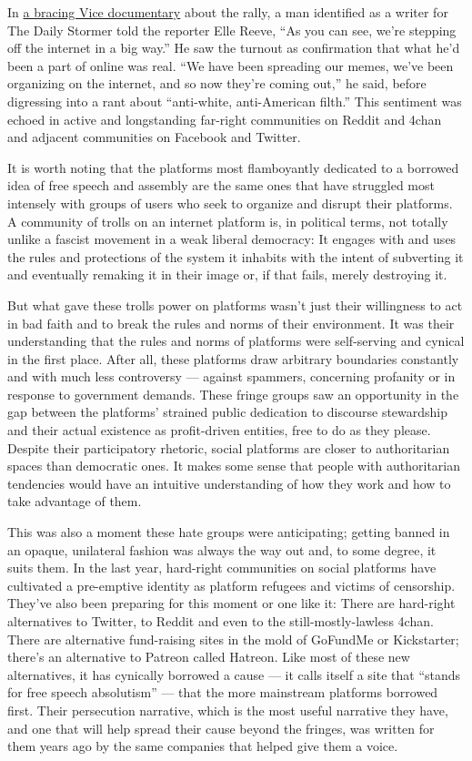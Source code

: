In
\href{https://news.vice.com/story/vice-news-tonight-full-episode-charlottesville-race-and-terror}{a
bracing Vice documentary} about the rally, a man identified as a writer
for The Daily Stormer told the reporter Elle Reeve, ``As you can see,
we're stepping off the internet in a big way.'' He saw the turnout as
confirmation that what he'd been a part of online was real. ``We have
been spreading our memes, we've been organizing on the internet, and so
now they're coming out,'' he said, before digressing into a rant about
``anti-white, anti-American filth.'' This sentiment was echoed in active
and longstanding far-right communities on Reddit and 4chan and adjacent
communities on Facebook and Twitter.

It is worth noting that the platforms most flamboyantly dedicated to a
borrowed idea of free speech and assembly are the same ones that have
struggled most intensely with groups of users who seek to organize and
disrupt their platforms. A community of trolls on an internet platform
is, in political terms, not totally unlike a fascist movement in a weak
liberal democracy: It engages with and uses the rules and protections of
the system it inhabits with the intent of subverting it and eventually
remaking it in their image or, if that fails, merely destroying it.

But what gave these trolls power on platforms wasn't just their
willingness to act in bad faith and to break the rules and norms of
their environment. It was their understanding that the rules and norms
of platforms were self-serving and cynical in the first place. After
all, these platforms draw arbitrary boundaries constantly and with much
less controversy --- against spammers, concerning profanity or in
response to government demands. These fringe groups saw an opportunity
in the gap between the platforms' strained public dedication to
discourse stewardship and their actual existence as profit-driven
entities, free to do as they please. Despite their participatory
rhetoric, social platforms are closer to authoritarian spaces than
democratic ones. It makes some sense that people with authoritarian
tendencies would have an intuitive understanding of how they work and
how to take advantage of them.

This was also a moment these hate groups were anticipating; getting
banned in an opaque, unilateral fashion was always the way out and, to
some degree, it suits them. In the last year, hard-right communities on
social platforms have cultivated a pre-emptive identity as platform
refugees and victims of censorship. They've also been preparing for this
moment or one like it: There are hard-right alternatives to Twitter, to
Reddit and even to the still-mostly-lawless 4chan. There are alternative
fund-raising sites in the mold of GoFundMe or Kickstarter; there's an
alternative to Patreon called Hatreon. Like most of these new
alternatives, it has cynically borrowed a cause --- it calls itself a
site that ``stands for free speech absolutism'' --- that the more
mainstream platforms borrowed first. Their persecution narrative, which
is the most useful narrative they have, and one that will help spread
their cause beyond the fringes, was written for them years ago by the
same companies that helped give them a voice.

